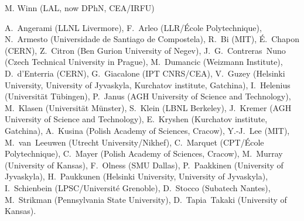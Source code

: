 { \small
{} M. Winn (LAL, now DPhN, CEA/IRFU) %

 A.~Angerami (LLNL Livermore), %
 F.~Arleo (LLR/{\'E}cole Polytechnique), %
 N.~Armesto (Universidade de Santiago de Compostela), %
 R.~Bi (MIT), %
 {\'E}.~Chapon (CERN), %
 Z.~Citron (Ben Gurion University of Negev), %
 J.~G.~Contreras~Nuno (Czech Technical University in Prague),  %
 M.~Dumancic (Weizmann Institute),
 D.~d'Enterria (CERN), %
 G.~Giacalone (IPT CNRS/CEA), %
 V.~Guzey (Helsinki University, University of Jyvaskyla, Kurchatov institute, Gatchina),  %
 I.~Helenius (Universit\"{a}t T\"{u}bingen), %
P.~Janus (AGH University of Science and Technology),
M.~Klasen (Universit\"{a}t M\"{u}nster), %
S.~Klein (LBNL Berkeley), %
J.~Kremer (AGH University of Science and Technology),
 E.~Kryshen (Kurchatov institute, Gatchina), %
 A.~Kusina (Polish Academy of Sciences, Cracow), %
 Y.-J.~Lee (MIT), %
 M.~van~Leeuwen (Utrecht University/Nikhef), %
 C.~Marquet (CPT/{\'E}cole Polytechnique), %
 C.~Mayer  (Polish Academy of Sciences, Cracow), %
 M.~Murray (University of Kansas), %
 F.~Olness (SMU Dallas), %
 P.~Paakkinen (University of Jyvaskyla), %
 H.~Paukkunen (Helsinki University, University of Jyvaskyla), %
 I.~Schienbein (LPSC/Universit{\'e} Grenoble), %
 D.~Stocco (Subatech Nantes), %
 M.~Strikman (Pennsylvania State University), %
 D.~Tapia~Takaki (University of Kansas). %
}

